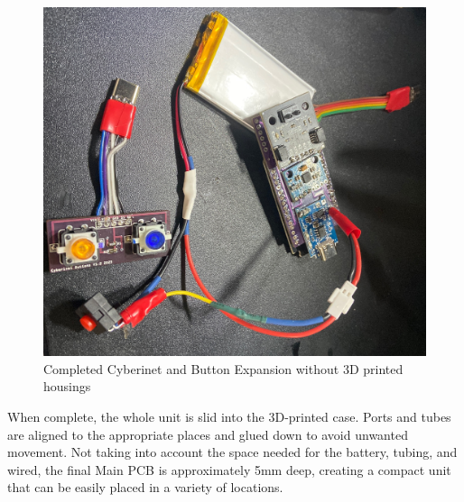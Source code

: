 \begin{center}
    \begin{figure}
        \centering
        \includegraphics[scale=0.1, angle=90]{diagrams/builtUnits/noCase.JPG}
        \caption{Completed Cyberinet and Button Expansion without 3D printed housings}
        \label{fig:CyberinetNoCase}
    \end{figure}
\end{center}

When complete, the whole unit is slid into the 3D-printed case. Ports and tubes are aligned to the appropriate places and glued down to avoid unwanted movement. Not taking into account the space needed for the battery, tubing, and wired, the final Main PCB is approximately 5mm deep, creating a compact unit that can be easily placed in a variety of locations.

